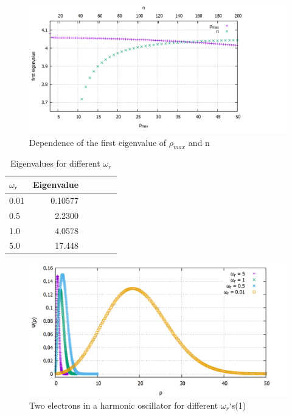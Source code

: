 \documentclass[10pt,a4paper]{article}
\begin{document}
\begin{figure}[h]
	\includegraphics[scale = 0.18]{rhomax_and_n_against_ev.png}
	\centering
	\caption{Dependence of the first eigenvalue of $\rho_{max}$ and n }
	\label{eigenvaluedependence}
\end{figure}

\begin{table}[h!]
	\centering
	\begin{tabular}{|l|r|c|lrp{16cm}}\hline
		$\omega_{r}$ & Eigenvalue\\\hline
		0.01 & 0.10577\\
		0.5 & 2.2300\\
		1.0 & 4.0578\\
		5.0 & 17.448\\\hline
	\end{tabular}
	\caption{Eigenvalues for different 	$\omega_{r}$}
	\label{ev2el}
\end{table}

\begin{figure}[h]
	\includegraphics[scale = 0.25]{2Electrons_comparison_thick.png}
	\centering
	\caption{Two electrons in a harmonic oscillator for different $\omega_{r}$`s(1) }
	\label{plot2el1}
\end{figure}
\end{document}
